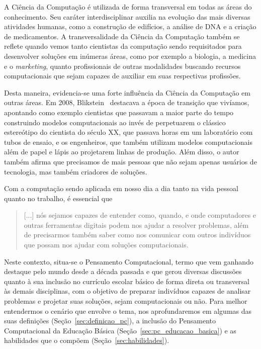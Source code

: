 A Ciência da Computação é utilizada de forma transversal em todas as áreas do conhecimento. Seu caráter interdisciplinar auxilia na evolução das mais diversas atividades humanas, como a construção de edifícios, a análise de DNA e a criação de medicamentos.  A transversalidade da Ciência da Computação também se reflete quando vemos tanto cientistas da computação sendo requisitados para desenvolver soluções em inúmeras áreas, como por exemplo a biologia, a medicina e o \textit{marketing}, quanto profissionais de outras modalidades buscando recursos computacionais que sejam capazes de auxiliar em suas respectivas profissões.

Desta maneira, evidencia-se uma forte influência da Ciência da Computação em outras áreas. Em 2008, Blikstein~\cite{blikstein_o_2008} destacava a época de transição que vivíamos, apontando como exemplo cientistas que passavam a maior parte do tempo construindo modelos computacionais ao invés de perpetuarem o clássico estereótipo do cientista do século XX, que passava horas em um laboratório com tubos de ensaio, e os engenheiros, que também utilizam modelos computacionais além de papel e lápis ao projetarem linhas de produção. Além disso, o autor também afirma que precisamos de mais pessoas que não sejam apenas usuários de tecnologia, mas também criadores de soluções.

Com a computação sendo aplicada em nosso dia a dia tanto na vida pessoal quanto no trabalho, é essencial que 
\begin{quote}
[...] nós sejamos capazes de entender como, quando, e onde computadores e outras ferramentas digitais podem nos ajudar a resolver problemas, além de precisarmos também saber como nos comunicar com outros indivíduos que possam nos ajudar com soluções computacionais.~\cite[~p.23, tradução das autoras]{barr_computational_2011}
\end{quote}

Neste contexto, situa-se o Pensamento Computacional, termo que vem ganhando destaque pelo mundo desde a década passada e que gerou diversas discussões quanto à sua inclusão no currículo escolar básico de forma direta ou transversal às demais disciplinas, com o objetivo de preparar indivíduos capazes de analisar problemas e projetar suas soluções, sejam computacionais ou não. Para melhor entendermos o cenário que envolve o tema, nos aprofundaremos em algumas das suas definições (Seção~\ref{sec:definicao_pc}), a inclusão do Pensamento Computacional da Educação Básica (Seção~\ref{sec:pc_educacao_basica}) e as habilidades que o compõem (Seção~\ref{sec:habilidades}).

